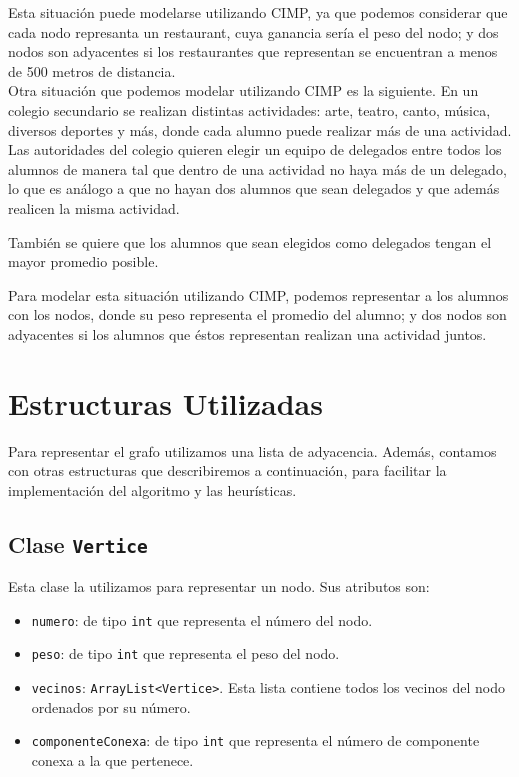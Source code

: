 \documentclass[a4paper, 10pt]{article}
\begin{document}
Esta situaci\'on puede modelarse utilizando CIMP, ya que podemos considerar que cada nodo represanta un restaurant, cuya ganancia ser\'ia el peso del nodo; y dos nodos son adyacentes si los restaurantes que representan se encuentran a menos de 500 metros de distancia. \\

Otra situaci\'on que podemos modelar utilizando CIMP es la siguiente. En un colegio secundario se realizan distintas actividades: arte, teatro, canto, m\'usica, diversos deportes y m\'as, donde cada alumno puede realizar m\'as de una actividad. Las autoridades del colegio quieren elegir un equipo de delegados entre todos los alumnos de manera tal que dentro de una actividad no haya m\'as de un delegado, lo que es an\'alogo a que no hayan dos alumnos que sean delegados y que adem\'as realicen la misma actividad.

Tambi\'en se quiere que los alumnos que sean elegidos como delegados tengan el mayor promedio posible.

Para modelar esta situaci\'on utilizando CIMP, podemos representar a los alumnos con los nodos, donde su peso representa el promedio del alumno; y dos nodos son adyacentes si los alumnos que \'estos representan realizan una actividad juntos.

\section{Estructuras Utilizadas}
Para representar el grafo utilizamos una lista de adyacencia. Adem\'as, contamos con otras estructuras que describiremos a continuaci\'on, para facilitar la implementaci\'on del algoritmo y las heur\'isticas.

\subsection{Clase \texttt{Vertice}}
Esta clase la utilizamos para representar un nodo. Sus atributos son:
\begin{itemize}
\item \texttt{numero}: de tipo \texttt{int} que representa el n\'umero del nodo.
\item \texttt{peso}: de tipo \texttt{int} que representa el peso del nodo.
\item \texttt{vecinos}: \texttt{ArrayList<Vertice>}. Esta lista contiene todos los vecinos del nodo ordenados por su n\'umero.
\item \texttt{componenteConexa}: de tipo \texttt{int} que representa el n\'umero de componente conexa a la que pertenece.
\end{itemize}
\end{document}
